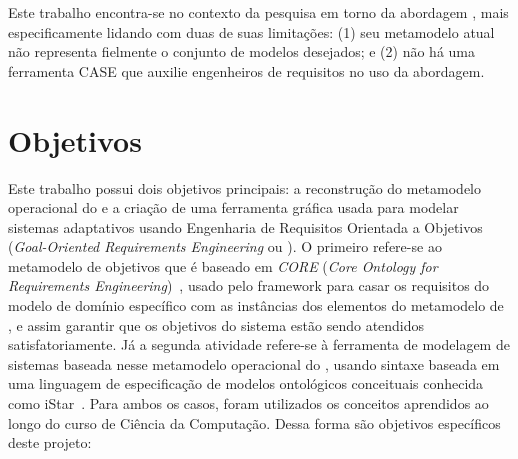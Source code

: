 Este trabalho encontra-se no contexto da pesquisa em torno da abordagem \zanshin, mais especificamente lidando com duas de suas limitações: (1) seu metamodelo atual não representa fielmente o conjunto de modelos desejados; e (2) não há uma ferramenta CASE que auxilie engenheiros de requisitos no uso da abordagem.



\section{Objetivos}
\label{sec-intro-objetivos}

Este trabalho possui dois objetivos principais: a reconstrução do metamodelo operacional do \zanshin e a criação de uma ferramenta gráfica usada para modelar sistemas adaptativos usando Engenharia de Requisitos Orientada a Objetivos (\textit{Goal-Oriented Requirements Engineering} ou \gore). O primeiro refere-se ao metamodelo de objetivos que é baseado em \textit{CORE} (\textit{Core Ontology for Requirements Engineering})~\cite{jureta2007core}, usado pelo framework para casar os requisitos do modelo de domínio específico com as instâncias dos elementos do metamodelo de \gore, e assim garantir que os objetivos do sistema estão sendo atendidos satisfatoriamente. Já a segunda atividade refere-se à ferramenta de modelagem de sistemas baseada nesse metamodelo operacional do \zanshin, usando sintaxe baseada em uma linguagem de especificação de modelos ontológicos conceituais conhecida como iStar~\cite{dalpiaz2016istar}. Para ambos os casos, foram utilizados os conceitos aprendidos ao longo do curso de Ciência da Computação. Dessa forma são objetivos específicos deste projeto:

